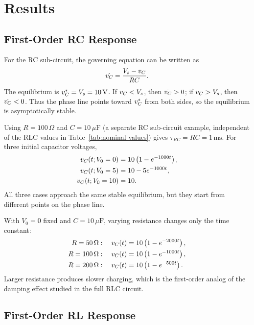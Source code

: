 \section{Results}
\label{sec:results}

\subsection{First-Order RC Response}
\label{ssec:rc_results}

For the RC sub-circuit, the governing equation can be written as
\begin{equation}
  \dot{v_C} = \frac{V_s - v_C}{RC}.
  \label{eq:rc_phase}
\end{equation}
The equilibrium is $v_C^\ast=V_s=10\,\mathrm{V}$.
If $v_C<V_s$, then $\dot{v_C}>0$; if $v_C>V_s$, then $\dot{v_C}<0$.
Thus the phase line points toward $v_C^\ast$ from both sides, so the
equilibrium is asymptotically stable.

Using $R=100\,\Omega$ and $C=10\,\mu\mathrm{F}$ (a separate RC sub-circuit
example, independent of the RLC values in Table~\ref{tab:nominal-values}) gives
$\tau_{RC}=RC=1\,\mathrm{ms}$.
For three initial capacitor voltages,
\begin{align}
  v_C(t;V_0=0) &= 10\left(1-e^{-1000t}\right), \label{eq:rc_v0_0}\\
  v_C(t;V_0=5) &= 10 - 5e^{-1000t}, \label{eq:rc_v0_5}\\
  v_C(t;V_0=10) &= 10. \label{eq:rc_v0_10}
\end{align}
All three cases approach the same stable equilibrium, but they start from
different points on the phase line.

With $V_0=0$ fixed and $C=10\,\mu\mathrm{F}$, varying resistance changes
only the time constant:
\begin{align}
  R=50\,\Omega: \quad v_C(t) &= 10\left(1-e^{-2000t}\right),
    \label{eq:rc_r_50}\\
  R=100\,\Omega: \quad v_C(t) &= 10\left(1-e^{-1000t}\right),
    \label{eq:rc_r_100}\\
  R=200\,\Omega: \quad v_C(t) &= 10\left(1-e^{-500t}\right).
    \label{eq:rc_r_200}
\end{align}
Larger resistance produces slower charging, which is the first-order analog
of the damping effect studied in the full RLC circuit.

\subsection{First-Order RL Response}
\label{ssec:rl_results}


